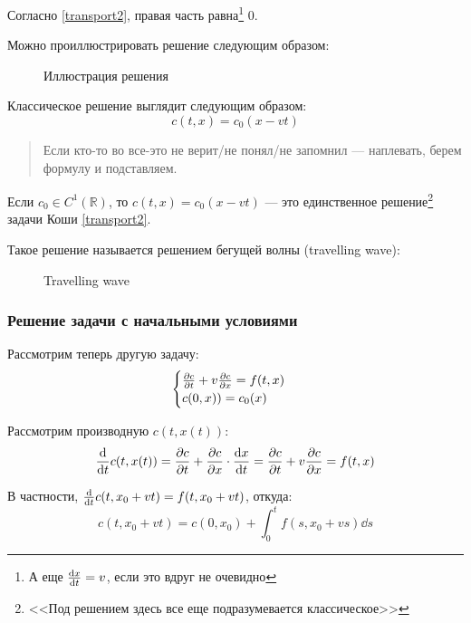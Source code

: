 Согласно \eqref{transport2}, правая часть равна\footnote{А еще $\dv{x}{t} = v$, если это вдруг не очевидно} $0$.

Можно проиллюстрировать решение следующим образом:
%
\begin{figure}[ht]
  \centering
  \caption{Иллюстрация решения}
\end{figure}

Классическое решение выглядит следующим образом:
%
\begin{equation}
  c(t, x) = c_0(x - vt)
\end{equation}

\begin{quote}
  Если кто-то во все-это не верит/не понял/не запомнил --- наплевать, берем формулу и подставляем.
\end{quote}

\begin{thm}
  Если $c_0 \in C^1(\mathbb{R})$, то $c(t, x) = c_0(x - vt)$ --- это единственное решение\footnote{<<Под решением здесь все еще подразумевается классическое>>} задачи Коши \eqref{transport2}.
\end{thm}

Такое решение называется решением бегущей волны (travelling wave):
%
\begin{figure}[ht]
  \centering
  \caption{Travelling wave}
\end{figure}

\subsubsection{Решение задачи с начальными условиями}

Рассмотрим теперь другую задачу:
%
\begin{equation}
  \begin{cases}
    \pdv{c}{t} + v \pdv{c}{x} = f(t, x) \\
    c(0, x)) = c_0(x)
  \end{cases} \label{cauchy2}
\end{equation}

Рассмотрим производную $c(t, x(t))$:
%
\begin{equation}
  \dv{t} c(t, x(t)) = \pdv{c}{t} + \pdv{c}{x} \cdot \dv{x}{t} = \pdv{c}{t} + v \pdv{c}{x} = f(t, x)
\end{equation}

В частности, $\dv{t} c(t, x_0 + vt) = f(t, x_0 + vt)$, откуда:
%
\begin{equation}
  c(t, x_0 + vt) = c(0, x_0) + \int_0^t f(s, x_0 + vs) \dd s
\end{equation}

